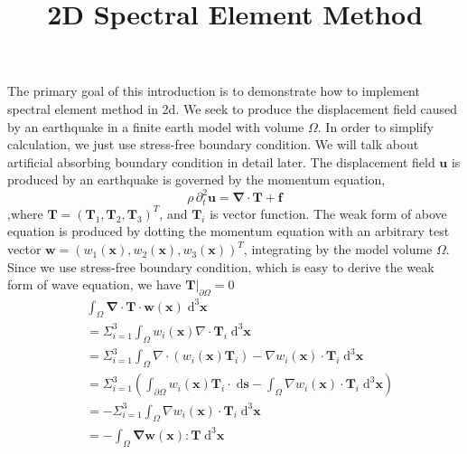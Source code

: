 \documentclass{book}
\title{2D Spectral Element Method}
\begin{document}
  The primary goal of this introduction is to demonstrate how to implement spectral element method in 2d. We seek to produce the displacement field caused by an earthquake in a finite earth model with volume $\Omega$. In order to simplify calculation, we just use stress-free boundary condition.  We will  talk about artificial absorbing  boundary condition in detail later.
  The displacement field $\boldsymbol{u}$ is produced by an earthquake is governed by the momentum equation,
  \begin{equation}
  \rho\,\partial_t^2\boldsymbol{u}=\boldsymbol{\nabla}\cdot\boldsymbol{T}+\boldsymbol{f}
  \end{equation}
  ,where $\boldsymbol T =(\boldsymbol T_1,\boldsymbol T_2,\boldsymbol T_3)^T$, and $\boldsymbol T_i$ is vector function.
  The weak form of above equation is produced by dotting the momentum equation with an arbitrary test vector $\boldsymbol{w}=(w_1(\boldsymbol x),w_2(\boldsymbol x),w_3(\boldsymbol x))^T $, integrating by the model volume $\Omega$. Since we use stress-free boundary condition, which is easy to derive the weak form of wave equation, we have $\boldsymbol T|_{\partial \Omega} = 0$
  \begin{equation}
  \begin{aligned}
  &\int_\Omega \boldsymbol{\nabla}\cdot\boldsymbol{T}\cdot\boldsymbol w(\boldsymbol{x})\;\mathrm{d}^3\boldsymbol{x}\\
  & = \Sigma _{i=1}^3\int_\Omega w_i(\boldsymbol{x})\nabla\cdot\boldsymbol{T}_i\;\mathrm{d}^3\boldsymbol{x}\\
  & = \Sigma_{i=1}^3\int_\Omega \nabla\cdot(w_i(\boldsymbol{x})\boldsymbol{T}_i) - \nabla w_i(\boldsymbol x) \cdot\boldsymbol T_i\;\mathrm{d}^3\boldsymbol{x}\\
  & = \Sigma_{i=1}^3\left(\int_{\partial\Omega} w_i(\boldsymbol{x})\boldsymbol T_i \cdot \;\mathrm{d}\boldsymbol{s}-\int_\Omega\nabla w_i(\boldsymbol x) \cdot\boldsymbol T_i\;\mathrm{d}^3\boldsymbol{x} \right)\\
  & = -\Sigma_{i=1}^3\int_\Omega\nabla w_i(\boldsymbol x) \cdot\boldsymbol T_i\;\mathrm{d}^3\boldsymbol{x}\\
  & = -\int_\Omega \boldsymbol{\nabla}\boldsymbol w(\boldsymbol x): \boldsymbol T\;\mathrm{d}^3\boldsymbol x
  \end{aligned}
  \end{equation}
\end{document}

